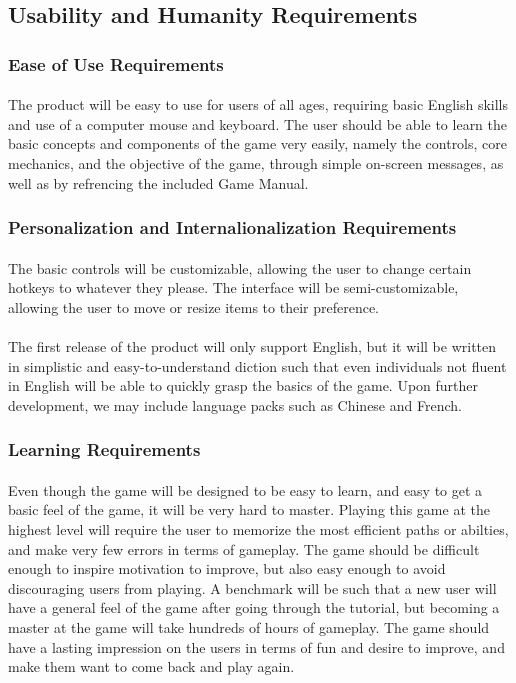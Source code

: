 \documentclass[12pt, titlepage]{article}
\begin{document}
\subsection{Usability and Humanity Requirements}
\subsubsection{Ease of Use Requirements}
\paragraph{}The product will be easy to use for users of all ages, requiring basic English skills and use of a computer mouse and keyboard. The user should be able to learn the basic concepts and components of the game very easily, namely the controls, core mechanics, and the objective of the game, through simple on-screen messages, as well as by refrencing the included Game Manual. 
\subsubsection{Personalization and Internalionalization Requirements}
\paragraph{}The basic controls will be customizable, allowing the user to change certain hotkeys to whatever they please. The interface will be semi-customizable, allowing the user to move or resize items to their preference. 
\paragraph{}The first release of the product will only support English, but it will be written in simplistic and easy-to-understand diction such that even individuals not fluent in English will be able to quickly grasp the basics of the game. Upon further development, we may include language packs such as Chinese and French. 
\subsubsection{Learning Requirements}
\paragraph{}Even though the game will be designed to be easy to learn, and easy to get a basic feel of the game, it will be very hard to master. Playing this game at the highest level will require the user to memorize the most efficient paths or abilties, and make very few errors in terms of gameplay. The game should be difficult enough to inspire motivation to improve, but also easy enough to avoid discouraging users from playing. A benchmark will be such that a new user will have a general feel of the game after going through the tutorial, but becoming a master at the game will take hundreds of hours of gameplay. The game should have a lasting impression on the users in terms of fun and desire to improve, and make them want to come back and play again. 
\end{document}
